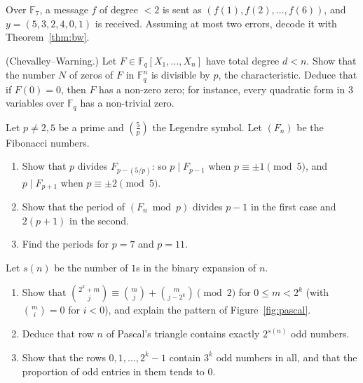 \begin{exercise}[$\star\star$]\label{ex:rs7}
Over $\mathbb F_7$, a message $f$ of degree $<2$ is sent as $(f(1),f(2),\dots,f(6))$, and $y=(5,3,2,4,0,1)$ is received. Assuming at most two errors, decode it with Theorem~\ref{thm:bw}.
\end{exercise}

\begin{exercise}[$\star\star\star$]\label{ex:chevalley}
(Chevalley--Warning.) Let $F\in\mathbb F_q[X_1,\dots,X_n]$ have total degree $d<n$. Show that the number $N$ of zeros of $F$ in $\mathbb F_q^n$ is divisible by $p$, the characteristic. Deduce that if $F(0)=0$, then $F$ has a non-zero zero; for instance, every quadratic form in $3$ variables over $\mathbb F_q$ has a non-trivial zero.
\end{exercise}

\begin{exercise}[$\star\star$]\label{pb:fibmodp}
Let $p\ne2,5$ be a prime and $\left(\frac5p\right)$ the Legendre symbol. Let $(F_n)$ be the Fibonacci numbers.
\begin{enumerate}[label=(\alph*)]
\item Show that $p$ divides $F_{p-(5/p)}$: so $p\mid F_{p-1}$ when $p\equiv\pm1\pmod5$, and $p\mid F_{p+1}$ when
$p\equiv\pm2\pmod5$.
\item Show that the period of $(F_n\bmod p)$ divides $p-1$ in the first case and $2(p+1)$ in the second.
\item Find the periods for $p=7$ and $p=11$.
\end{enumerate}
\end{exercise}

\begin{exercise}[$\star$]\label{pb:pascal2}
Let $s(n)$ be the number of $1$s in the binary expansion of $n$.
\begin{enumerate}[label=(\alph*)]
\item Show that $\binom{2^k+m}j\equiv\binom mj+\binom m{j-2^k}\pmod2$ for $0\le m<2^k$ (with $\binom mi=0$ for $i<0$),
and explain the pattern of Figure~\ref{fig:pascal}.
\item Deduce that row $n$ of Pascal's triangle contains exactly $2^{s(n)}$ odd numbers.
\item Show that the rows $0,1,\dots,2^k-1$ contain $3^k$ odd numbers in all, and that the proportion of odd entries in them
tends to $0$.
\end{enumerate}
\end{exercise}

